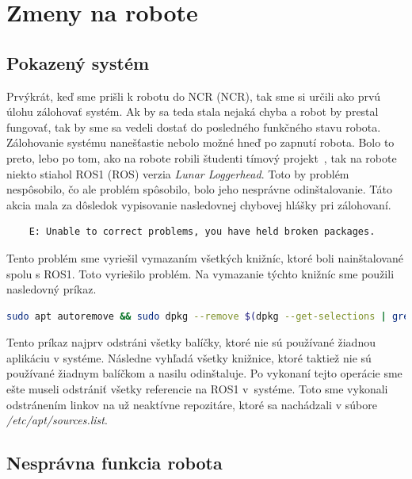 \section{Zmeny na robote}

\subsection{Pokazený systém}
\label{subsec:brokenSystem}

Prvýkrát, keď sme prišli k robotu do NCR (\acrlong{NCR}), tak sme si určili ako prvú úlohu zálohovať systém. Ak by sa teda stala nejaká chyba
a robot by prestal fungovať, tak by sme sa vedeli dostať do posledného funkčného stavu robota. Zálohovanie systému nanešťastie nebolo možné
hneď po zapnutí robota. Bolo to preto, lebo po tom, ako na robote robili študenti tímový projekt~\cite{timovyProjekt}, tak na robote niekto
stiahol ROS1 (\acrlong{ROS}) verzia \textit{Lunar Loggerhead}. Toto by problém nespôsobilo, čo ale problém spôsobilo, bolo jeho nesprávne odinštalovanie.
Táto akcia mala za dôsledok vypisovanie nasledovnej chybovej hlášky pri zálohovaní.

\begin{lstlisting}
	E: Unable to correct problems, you have held broken packages.
\end{lstlisting}

Tento problém sme vyriešil vymazaním všetkých knižníc, ktoré boli nainštalované spolu s ROS1. Toto vyriešilo problém. Na vymazanie týchto
knižníc sme použili nasledovný príkaz.

\begin{lstlisting}[language=bash]
	sudo apt autoremove && sudo dpkg --remove $(dpkg --get-selections | grep hold)
\end{lstlisting}

Tento príkaz najprv odstráni všetky balíčky, ktoré nie sú používané žiadnou aplikáciu v systéme. Následne vyhľadá všetky knižnice,
ktoré taktiež nie sú používané žiadnym balíčkom a nasilu odinštaluje. Po vykonaní tejto operácie sme ešte museli odstrániť všetky referencie
na ROS1 v~systéme. Toto sme vykonali odstránením linkov na už neaktívne repozitáre, ktoré sa nachádzali v súbore \textit{/etc/apt/sources.list}.

\subsection{Nesprávna funkcia robota}
\label{subsec:wrongFunctionality}

